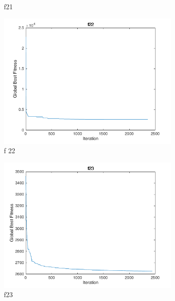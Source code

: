 \begin{figure}
\begin{subfigure}[b]{0.4\textwidth}
    \caption{f21}
  \end{subfigure}
  \begin{subfigure}[b]{0.4\textwidth}
    \includegraphics[width=\textwidth]{img/cecrt/f22}
    \caption{f 22}
  \end{subfigure}
  \begin{subfigure}[b]{0.4\textwidth}
    \includegraphics[width=\textwidth]{img/cecrt/f23}
    \caption{f23}
  \end{subfigure}
  \begin{subfigure}[b]{0.4\textwidth}

\end{subfigure}
\end{figure}
